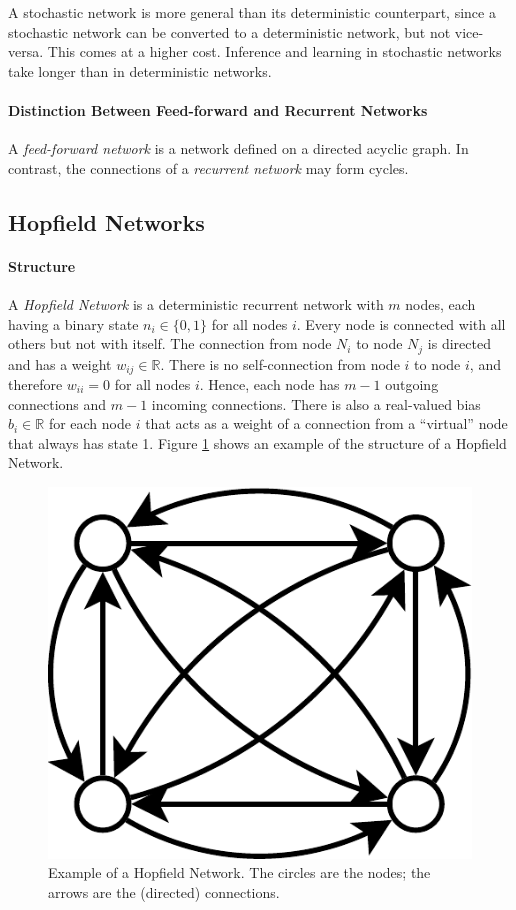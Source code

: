 A stochastic network is more general than its deterministic counterpart,
since a stochastic network can be converted to a deterministic network,
but not vice-versa. This comes at a higher cost. Inference and learning
in stochastic networks take longer than in deterministic networks.

\paragraph{Distinction Between Feed-forward and Recurrent Networks}

A \emph{feed-forward network}\emph{
}is a network defined on a directed acyclic graph. In contrast, the
connections of a \emph{recurrent network}\emph{
}may form cycles.

\subsection{Hopfield Networks}

\paragraph{Structure}

A \emph{Hopfield Network} \cite{Hopfield1984}
is a deterministic recurrent network with $m$ nodes, each having
a binary state $n_{i}\in\{0,1\}$ for all nodes $i$. Every node is
connected with all others but not with itself. The connection from
node $N_{i}$ to node $N_{j}$ is directed and has a weight $w_{ij}\in\mathbb{R}$.
There is no self-connection from node $i$ to node $i$, and therefore
$w_{ii}=0$ for all nodes $i$. Hence, each node has $m-1$ outgoing
connections and $m-1$ incoming connections. There is also a real-valued
bias $b_{i}\in\mathbb{R}$ for each node $i$ that acts as a weight
of a connection from a ``virtual'' node that always has state 1.
Figure \ref{fig:Example-of-a-Hopfield-Network} shows an example of
the structure of a Hopfield Network.

\begin{figure}
\begin{centering}
\includegraphics[width=0.3\columnwidth]{images/hopfield-network-example}
\par\end{centering}
\caption[Example of a Hopfield Network.]{\label{fig:Example-of-a-Hopfield-Network}Example of a Hopfield Network.
The circles are the nodes; the arrows are the (directed) connections.}
\end{figure}

